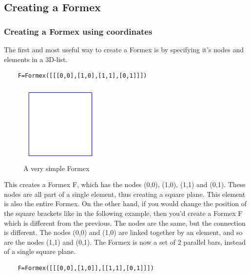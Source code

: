 \subsection{Creating a Formex}
\label{subsec:create}


\subsubsection{Creating a Formex using coordinates}
The first and most useful way to create a Formex is by specifying it's nodes and elements in a 3D-list.  

\begin{verbatim}
	F=Formex([[[0,0],[1,0],[1,1],[0,1]]])
\end{verbatim}

\begin{figure}[ht]
  \centering
  \begin{makeimage}
  \end{makeimage}
  \begin{latexonly}
    \includegraphics[width=4cm]{images/square}
  \end{latexonly}
  \begin{htmlonly}
  \end{htmlonly}  
  \caption{A very simple Formex}
  \label{fig:square}
\end{figure}

This creates a Formex F, which has the nodes (0,0), (1,0), (1,1) and (0,1). These nodes are all part of a single element, thus creating a square plane. This element is also the entire Formex.
On the other hand, if you would change the position of the square brackets like in the following example, then you'd create a Formex F which is different from the previous. The nodes are the same, but the connection is different. The nodes (0,0) and (1,0) are linked together by an element, and so are the nodes (1,1) and (0,1). The Formex is now a set of 2 parallel bars, instead of a single square plane. 
\begin{verbatim}
	F=Formex([[[0,0],[1,0]],[[1,1],[0,1]]])
\end{verbatim}

